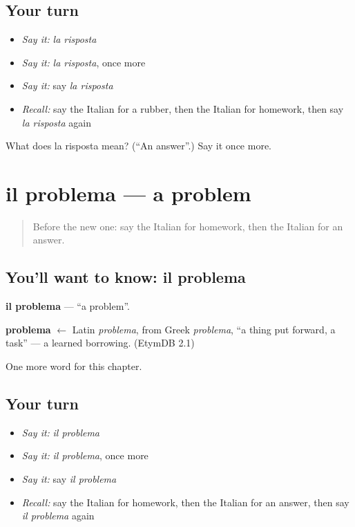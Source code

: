 \subsection*{Your turn}
\begin{itemize}
\raggedright
  \item \emph{Say it:} \emph{la risposta}
  \item \emph{Say it:} \emph{la risposta}, once more
  \item \emph{Say it:} say \emph{la risposta}
  \item \emph{Recall:} say the Italian for a rubber, then the Italian for homework, then say \emph{la risposta} again
\end{itemize}

\begin{tcolorbox}[breakable,colback=teal!4,colframe=teal!35!black,title={Before you move on}]
What does la risposta mean? (\textquotedblleft{}An answer\textquotedblright{}.) Say it once more.
\end{tcolorbox}
\section[il problema]{il problema — a problem}

\label{lesson:IT-C115-problema}



\begin{quote}
Before the new one: say the Italian for homework, then the Italian for an answer.
\end{quote}

\subsection*{You'll want to know: il problema}
\textbf{il problema} — \textquotedblleft{}a problem\textquotedblright{}.

\begin{cousinweb}
\textbf{problema} $\leftarrow$ Latin \emph{problema}, from Greek \emph{problema}, \textquotedblleft{}a thing put forward, a task\textquotedblright{} — a learned borrowing. (EtymDB 2.1)
\end{cousinweb}

\begin{grammarlens}[title={What you've built}]
One more word for this chapter.
\end{grammarlens}

\subsection*{Your turn}
\begin{itemize}
\raggedright
  \item \emph{Say it:} \emph{il problema}
  \item \emph{Say it:} \emph{il problema}, once more
  \item \emph{Say it:} say \emph{il problema}
  \item \emph{Recall:} say the Italian for homework, then the Italian for an answer, then say \emph{il problema} again
\end{itemize}

